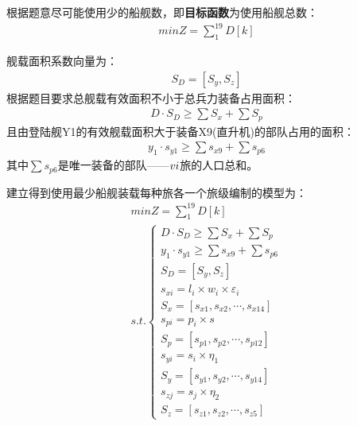 \documentclass{whutmod}
\begin{document}
	    根据题意尽可能使用少的船舰数，即\textbf{目标函数}为使用船舰总数：
	     \begin{gather}
	    min Z=\sum _{1}^{19}D[k]
	  \end{gather}
	    
	    
	   舰载面积系数向量为：
	    \begin{gather}
	    S_{D}=[S_{y}, S_{z}]
    	\end{gather}
    	根据题目要求总舰载有效面积不小于总兵力装备占用面积：
    	 \begin{gather}
    	 D\cdot S_{D}\geq \sum  S_{x} + \sum  S_{p}
    	 \end{gather}
    	 且由登陆舰Y1的有效舰载面积大于装备X9(直升机)的部队占用的面积：
    	  \begin{gather}
    	 y_{1}\cdot s_{y1}\geq \sum s_{x9}+ \sum  s_{p6}
    	 \end{gather}
    	 其中$\sum  s_{p6}$是唯一装备的部队——$\uppercase\expandafter{\romannumeral6}$旅的人口总和。
    	 

    	 建立得到使用最少船舰装载每种旅各一个旅级编制的模型为：
    	  \begin{gather}
    	 min Z=\sum _{1}^{19}D[k]\\ 
    	  s.t.\left\{\begin{matrix}	 D\cdot S_{D}\geq \sum  S_{x} + \sum  S_{p}
    	 \\ y_{1}\cdot s_{y1}\geq \sum s_{x9}+ \sum  s_{p6}
    	 \\S_{D}=[S_{y}, S_{z}]
    	 \\ s_{xi}=l_{i}\times w_{i} \times \varepsilon _{i}
    	 \\S_{x}=[s_{x1},s_{x2},\cdots,s_{x14}]
    	 \\s_{pi}=p_{i}\times s
    	 \\S_{p}=[s_{p1},s_{p2},\cdots,s_{p12}]
    	 \\     s_{yi}=s_{i}\times \eta_{1}
    	 \\   S_{y}=[s_{y1},s_{y2},\cdots,s_{y14}]
    	 \\      s_{zj}=s_{j}\times \eta_{2}
    	 \\ S_{z}=[s_{z1},s_{z2},\cdots,s_{z5}]
    	 \end{matrix}\right. 
     	 \end{gather}
\end{document}
